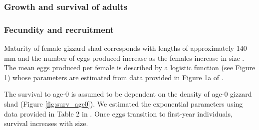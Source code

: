 \documentclass[11pt,oneside]{amsart}
\theoremstyle{definition}
\begin{document}
\subsubsection{Growth and survival of adults}

\subsubsection{Fecundity and recruitment}
Maturity of female gizzard shad corresponds with lengths of approximately 140 mm and the number of eggs produced increase as the females increase in size \citep{jons1997ovarian}.  The mean eggs produced per female is described by a logistic function (see Figure 1) whose parameters are estimated from data provided in Figure 1a of \citep{jons1997ovarian}. 


The survival to age-0 is assumed to be dependent on the density of age-0 gizzard shad (Figure \ref{fig:surv_age0}).  We estimated the exponential parameters using data provided in Table 2 in \citep{michaletz2010overwinter}. Once eggs transition to first-year individuals, survival increases with size.
\end{document}
